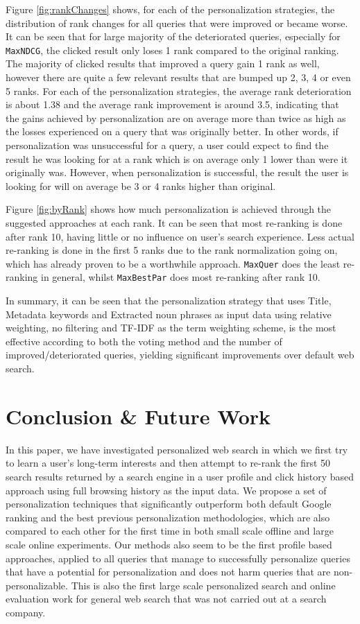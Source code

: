\documentclass{sig-alternate}
\begin{document}
Figure \ref{fig:rankChanges} shows, for each of the personalization strategies, the distribution of rank changes for all queries that were improved or became worse. It can be seen that for large majority of the deteriorated queries, especially for {\tt MaxNDCG}, the clicked result only loses 1 rank compared to the original ranking. The majority of clicked results that improved a query gain 1 rank as well, however there are quite a few relevant results that are bumped up 2, 3, 4 or even 5 ranks. For each of the personalization strategies, the average rank deterioration is about 1.38 and the average rank improvement is around 3.5, indicating that the gains achieved by personalization are on average more than twice as high as the losses experienced on a query that was originally better. In other words, if personalization was unsuccessful for a query, a user could expect to find the result he was looking for at a rank which is on average only 1 lower than were it originally was. However, when personalization is successful, the result the user is looking for will on average be 3 or 4 ranks higher than original.

Figure \ref{fig:byRank} shows how much personalization is achieved through the suggested approaches at each rank. It can be seen that most re-ranking is done after rank 10, having little or no influence on user's search experience. Less actual re-ranking is done in the first 5 ranks due to the rank normalization going on, which has already proven to be a worthwhile approach. {\tt MaxQuer} does the least re-ranking in general, whilst {\tt MaxBestPar} does most re-ranking after rank 10.

In summary, it can be seen that the personalization strategy that uses Title, Metadata keywords and Extracted noun phrases as input data using relative weighting, no filtering and TF-IDF as the term weighting scheme, is the most effective according to both the voting method and the number of improved/deteriorated queries, yielding significant improvements over default web search.

\section{Conclusion \& Future Work}

In this paper, we have investigated personalized web search in which we first try to learn a user's long-term interests and then attempt to re-rank the first 50 search results returned by a search engine in a user profile and click history based approach using full browsing history as the input data. We propose a set of personalization techniques that significantly outperform both default Google ranking and the best previous personalization methodologies, which are also compared to each other for the first time in both small scale offline and large scale online experiments. Our methods also seem to be the first profile based approaches, applied to all queries that manage to successfully personalize queries that have a potential for personalization and does not harm queries that are non-personalizable. This is also the first large scale personalized search and online evaluation work for general web search that was not carried out at a search company.
\end{document}
